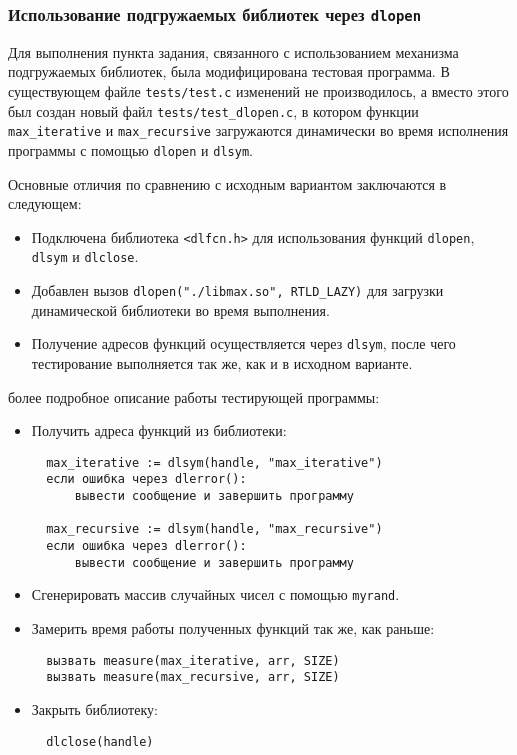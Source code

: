 \subsubsection{Использование подгружаемых библиотек через \texttt{dlopen}}

Для выполнения пункта задания, связанного с использованием механизма подгружаемых библиотек, была модифицирована тестовая программа.
В существующем файле \texttt{tests/test.c} изменений не производилось, а вместо этого был создан новый файл \texttt{tests/test\_dlopen.c}, в котором функции \texttt{max\_iterative} и \texttt{max\_recursive} загружаются динамически во время исполнения программы с помощью \texttt{dlopen} и \texttt{dlsym}.

Основные отличия по сравнению с исходным вариантом заключаются в следующем:
\begin{itemize}
\item Подключена библиотека \texttt{<dlfcn.h>} для использования функций \texttt{dlopen}, \texttt{dlsym} и \texttt{dlclose}.
\item Добавлен вызов \texttt{dlopen("./libmax.so", RTLD\_LAZY)} для загрузки динамической библиотеки во время выполнения.
\item Получение адресов функций осуществляется через \texttt{dlsym}, после чего тестирование выполняется так же, как и в исходном варианте.
\end{itemize}

\vspace{.3cm}
 более подробное описание работы тестирующей программы:

\begin{itemize}
  \item Получить адреса функций из библиотеки:
  \begin{lstlisting}
  max_iterative := dlsym(handle, "max_iterative")
  если ошибка через dlerror():
      вывести сообщение и завершить программу
  
  max_recursive := dlsym(handle, "max_recursive")
  если ошибка через dlerror():
      вывести сообщение и завершить программу
  \end{lstlisting}
  
  \item Сгенерировать массив случайных чисел с помощью \texttt{myrand}.
  
  \item Замерить время работы полученных функций так же, как раньше:
  \begin{lstlisting}
  вызвать measure(max_iterative, arr, SIZE)
  вызвать measure(max_recursive, arr, SIZE)
  \end{lstlisting}
  
  \item Закрыть библиотеку:
  \begin{lstlisting}
  dlclose(handle)
  \end{lstlisting}
\end{itemize}

